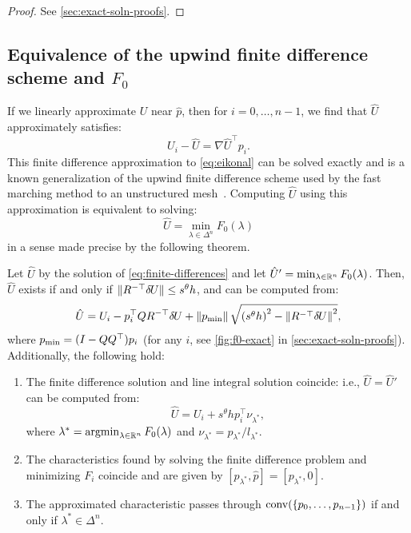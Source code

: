 \documentclass{article}
\begin{document}
\begin{proof}
  See \cref{sec:exact-soln-proofs}.
\end{proof}

\subsection{Equivalence of the upwind finite difference scheme and
  $F_0$}\label{ssec:equivalence}

If we linearly approximate $U$ near $\hat{p}$, then for
$i = 0, \hdots, n - 1$, we find that $\hat{U}$ approximately
satisfies:
\begin{equation}
  \label{eq:finite-differences}
  U_i - \hat{U} = \nabla \hat{U}^\top p_i.
\end{equation}
This finite difference approximation to \cref{eq:eikonal} can be
solved exactly and is a known generalization of the upwind finite
difference scheme used by the fast marching method to an unstructured
mesh~\cite{kimmel1998computing,sethian2000fast}. Computing $\hat{U}$
using this approximation is equivalent to solving:
\begin{equation}
  \hat{U} = \min_{\lambda \in \Delta^n} F_0(\lambda)
\end{equation}
in a sense made precise by the following theorem.

\begin{theorem}\label{thm:equivalence}
  Let $\hat{U}$ by the solution of \cref{eq:finite-differences} and
  let $\hat{U}' = \min_{\lambda \in \mathbb{R}^n} F_0(\lambda)$. Then,
  $\hat{U}$ exists if and only if
  $\|R^{-\top} {\delta \hspace{-0.09em} U}\| \leq s^\theta h$, and can be computed from:
  \begin{equation}
    \label{eq:U-finite-diff}
    \hat{U} = U_i - p_i^\top Q R^{-\top} {\delta \hspace{-0.09em} U} + \left\|p_{\operatorname{min}}\right\| \sqrt{{(s^\theta h)}^2 - \left\|R^{-\top} {\delta \hspace{-0.09em} U}\right\|^2},
  \end{equation}
  where $p_{\operatorname{min}} = (I - QQ^\top) p_i$ (for any $i$, see
  \cref{fig:f0-exact} in \cref{sec:exact-soln-proofs}). Additionally,
  the following hold:
  \begin{enumerate}
  \item The finite difference solution and line integral solution
    coincide: i.e., $\hat{U} = \hat{U}'$ can be computed from:
    \begin{equation}
      \label{eq:U-from-Ui-exact}
      \hat{U} = U_i + s^\theta h p_i^\top \nu_{\lambda^*},
    \end{equation}
    where $\lambda^* = \operatorname{argmin}_{\lambda \in \mathbb{R}^n} F_0(\lambda)$ and
    $\nu_{\lambda^*} = p_{\lambda^*}/l_{\lambda^*}$.
  \item The characteristics found by solving the finite difference
    problem and minimizing $F_i$ coincide and are given by
    $[p_{\lambda^*}, \hat{p}] = [p_{\lambda^*}, 0]$.
  \item The approximated characteristic passes through
    $\operatorname{conv}(\left\{p_0, \hdots, p_{n-1}\right\})$ if and only if
    $\lambda^* \in \Delta^n$.
  \end{enumerate}
\end{theorem}
\end{document}
